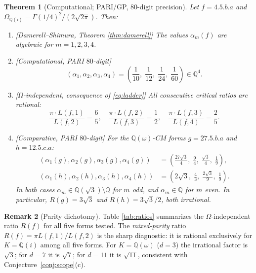 \documentclass[10pt]{article}
\newtheorem{theorem}{Theorem}[section]
\theoremstyle{definition}
\newtheorem{remark}[theorem]{Remark}
\newcommand{\Q}{\mathbb{Q}}
\newcommand{\OmI}{\Omega_{\Q(i)}}
\begin{document}
\begin{theorem}[Computational; PARI/GP, $80$-digit precision]
\label{thm:main}
Let $f = 4.5.b.a$ and $\OmI = \Gamma(1/4)^2/(2\sqrt{2\pi})$.  Then:
\begin{enumerate}
  \item[\rm(1)] \textup{[Damerell--Shimura, Theorem \ref{thm:damerell}]}
        The values $\alpha_m(f)$ are algebraic for $m = 1,2,3,4$.
  \item[\rm(2)] \textup{[Computational, PARI $80$-digit]}
        \begin{equation}\label{eq:ladder}
          (\alpha_1, \alpha_2, \alpha_3, \alpha_4) =
          \left(\frac{1}{10},\; \frac{1}{12},\; \frac{1}{24},\; \frac{1}{60}\right)
          \in \Q^4.
        \end{equation}
  \item[\rm(3)] \textup{[$\Omega$-independent, consequence of \eqref{eq:ladder}]}
        All consecutive critical ratios are rational:
        \begin{equation}\label{eq:ratios}
          \frac{\pi \cdot L(f,1)}{L(f,2)} = \frac{6}{5},\quad
          \frac{\pi \cdot L(f,2)}{L(f,3)} = \frac{1}{2},\quad
          \frac{\pi \cdot L(f,3)}{L(f,4)} = \frac{2}{5}.
        \end{equation}
  \item[\rm(4)] \textup{[Comparative, PARI $80$-digit]}
        For the $\Q(\omega)$-CM forms $g = 27.5.b.a$ and $h = 12.5.c.a$:
        \begin{align*}
          (\alpha_1(g), \alpha_2(g), \alpha_3(g), \alpha_4(g))
            &= \left(\tfrac{27\sqrt{3}}{4},\; \tfrac{9}{4},\;
               \tfrac{\sqrt{3}}{4},\; \tfrac{1}{9}\right),\\
          (\alpha_1(h), \alpha_2(h), \alpha_3(h), \alpha_4(h))
            &= \left(2\sqrt{3},\; \tfrac{4}{3},\;
               \tfrac{2\sqrt{3}}{9},\; \tfrac{1}{9}\right).
        \end{align*}
        In both cases $\alpha_m \in \Q(\sqrt{3})\setminus\Q$ for $m$ odd,
        and $\alpha_m \in \Q$ for $m$ even.
        In particular, $R(g) = 3\sqrt{3}$ and $R(h) = 3\sqrt{3}/2$, both
        irrational.
\end{enumerate}
\end{theorem}

\begin{remark}[Parity dichotomy]
Table \ref{tab:ratios} summarizes the $\Omega$-independent ratio $R(f)$
for all five forms tested.  The \emph{mixed-parity}
ratio $R(f) = \pi L(f,1)/L(f,2)$ is the sharp diagnostic: it is rational
exclusively for $K = \Q(i)$ among all five forms.  For $K = \Q(\omega)$
($d=3$) the irrational factor is $\sqrt{3}$; for $d=7$ it is $\sqrt{7}$;
for $d=11$ it is $\sqrt{11}$, consistent with Conjecture~\ref{conj:scope}(c).
\end{remark}
\end{document}
